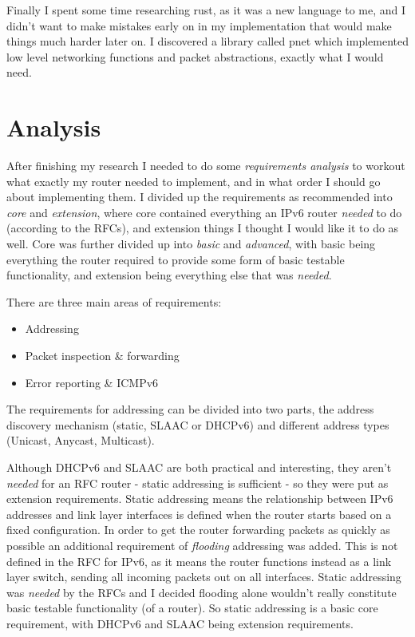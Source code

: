 \documentclass[12pt,a4paper,twoside,openright]{report}
\begin{document}
\bigskip

Finally I spent some time researching rust, as it was a new language to me, and I didn't want to make mistakes early on in my implementation that would make things much harder later on.  I discovered a library called pnet\cite{pnet_rust} which implemented low level networking functions and packet abstractions, exactly what I would need.

\section{Analysis}

After finishing my research I needed to do some \textit{requirements analysis} to workout what exactly my router needed to implement, and in what order I should go about implementing them.  I divided up the requirements as recommended into \textit{core} and \textit{extension}, where core contained everything an IPv6 router \textit{needed} to do (according to the RFCs), and extension things I thought I would like it to do as well.  Core was further divided up into \textit{basic} and \textit{advanced}, with basic being everything the router required to provide some form of basic testable functionality, and extension being everything else that was \textit{needed}.

\bigskip

There are three main areas of requirements:
\begin{itemize}
\item Addressing
\item Packet inspection \& forwarding
\item Error reporting \& ICMPv6\cite{icmpv6_rfc}
\end{itemize}

\bigskip

The requirements for addressing can be divided into two parts, the address discovery mechanism (static, SLAAC\cite{slaac_rfc} or DHCPv6\cite{dhcpv6_rfc}) and different address types (Unicast, Anycast, Multicast).  

Although DHCPv6 and SLAAC are both practical and interesting, they aren't \textit{needed} for an RFC router - static addressing is sufficient - so they were put as extension requirements.  Static addressing means the relationship between IPv6 addresses and link layer interfaces is defined when the router starts based on a fixed configuration. In order to get the router forwarding packets as quickly as possible an additional requirement of \textit{flooding} addressing was added.  This is not defined in the RFC for IPv6, as it means the router functions instead as a link layer switch, sending all incoming packets out on all interfaces. Static addressing was \textit{needed} by the RFCs and I decided flooding alone wouldn't really constitute basic testable functionality (of a router). So static addressing is a basic core requirement, with DHCPv6 and SLAAC being extension requirements.
\end{document}
